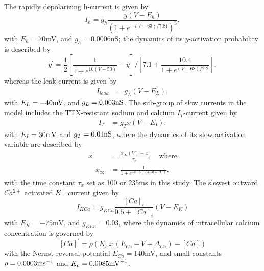 \documentclass[nofootinbib,aip,amsmath,amssymb,reprint,twocolumn,10pt]{revtex4-2}
\begin{document}
The rapidly depolarizing h-current is given by 
\begin{equation}
I_{h}=g_{h} \frac{y (V-E_{h})}{(1+e^{-(V-63)/7.8)})^3}, 
\end{equation}
with $E_{h}=70$mV, and $g_h=0.0006$nS; the dynamics of its $y$-activation probability is described by 
 \begin{equation}
{y}^\prime = \frac{1}{2} \left [ \frac{1}{1+e^{10(V-50)}}-y \right ]/ \left [ 7.1+\frac{10.4}{1+e^{(V+68)/2.2}} \right ], 
\end{equation}	
whereas the leak current is given by 
\begin{align}
I_{leak} &=g_{L} (V-E_{L}), 
\end{align}
with $E_{L} =-40{\rm mV}$, and $g_{L}=0.003{\rm nS}$. The sub-group of slow currents in the model includes the TTX-resistant sodium and calcium $I_{T}$-current given by   \begin{align}
 I_{T} &= g_{T} x (V-E_{I}),
\end{align}
with $E_{I} =30{\rm mV}$ and $g_{T}=0.01{\rm nS}$, where the dynamics of its slow activation variable are described by  
 \begin{align}
{x}^\prime &= \frac{x_{\infty}(V)-x}{\tau_{x}}, \quad \mbox{where} \\ 
\quad x_{\infty} &= \frac{1}{1+e^{-0.15(V+50-\Delta_x)}},
\end{align}\label{eqttx} 
with the time constant $\tau_{x}$ set as 100 or 235ms in this study. The slowest outward $Ca^{2+}$ activated $K^+$ current given by  
\begin{equation}
I_{KCa} =g_{KCa}\frac{[Ca]_i}{0.5+[Ca]_i}(V-E_{K})
 \label{IKCa}
\end{equation}
with  $E_{K}=-75\mbox{mV}$, and $g_{KCa}=0.03$, where the dynamics of intracellular calcium concentration is governed by 
\begin{equation}
{[Ca]}^\prime  =  \rho \left ( K_{c}\, x\, (E_{Ca}-V + \Delta_{Ca})-[Ca] \right  )  \label{eqCa}
\end{equation}
with the Nernst reversal potential  $E_{Ca}=140$mV, and small constants $\rho= 0.0003{\rm ms}^{-1}$ and  $K_c=0.0085{\rm mV}^{-1}$.
\end{document}
